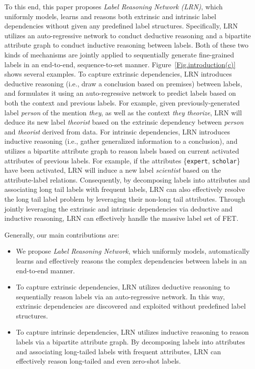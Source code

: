 \documentclass[11pt]{article}
\begin{document}
To this end, this paper proposes \textit{Label Reasoning Network (LRN)}, which uniformly models, learns and reasons both extrinsic and intrinsic label dependencies without given any predefined label structures. Specifically, LRN utilizes an auto-regressive network to conduct deductive reasoning and a bipartite attribute graph to conduct inductive reasoning between labels. Both of these two kinds of mechanisms are jointly applied to sequentially generate fine-grained labels in an end-to-end, sequence-to-set manner. Figure~\ref{Fig.introduction(c)} shows several examples. To capture extrinsic dependencies, LRN introduces deductive reasoning (i.e., draw a conclusion based on premises) between labels, and formulates it using an auto-regressive network to predict labels based on both the context and previous labels. For example, given previously-generated label \textit{person} of the mention \textit{they}, as well as  the context \textit{they theorize}, LRN will deduce its new label \textit{theorist} based on the extrinsic dependency between \textit{person} and \textit{theorist} derived from data. For intrinsic dependencies, LRN introduces inductive reasoning (i.e., gather generalized information to a conclusion), and utilizes a bipartite attribute graph to reason labels based on current activated attributes of previous labels. For example, if the attributes \{\texttt{expert}, \texttt{scholar}\} have been activated, LRN will induce a new label \textit{scientist} based on the attribute-label relations. Consequently, by decomposing labels into attributes and associating long tail labels with frequent labels, LRN can also effectively resolve the long tail label problem by leveraging their non-long tail attributes. Through jointly leveraging the extrinsic and intrinsic dependencies via deductive and inductive reasoning, LRN can effectively handle the massive label set of FET.

Generally, our main contributions are:
\begin{itemize}[leftmargin=0.6cm,topsep=0.1cm]
\setlength{\itemsep}{0cm}
\setlength{\parskip}{0.1cm}
\item We propose \textit{Label Reasoning Network}, which uniformly models, automatically learns and effectively reasons the complex dependencies between labels in an end-to-end manner.

\item To capture extrinsic dependencies, LRN utilizes deductive reasoning to sequentially reason labels via an auto-regressive network. In this way, extrinsic dependencies are discovered and exploited without predefined label structures.

\item To capture intrinsic dependencies, LRN utilizes inductive reasoning to reason labels via a bipartite attribute graph. By decomposing labels into attributes and associating long-tailed labels with frequent attributes, LRN can effectively reason long-tailed and even zero-shot labels.
\end{itemize}
\end{document}
